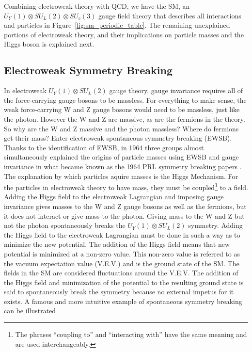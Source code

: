 Combining electroweak theory with QCD, we have the SM, an $U_{Y}(1) \otimes SU_{L}(2) \otimes SU_{c}(3)$ gauge field theory that describes all interactions and particles in
Figure~\ref{fig:sm_periodic_table}. The remaining unexplained portions of electroweak theory, and their implications on particle masses and the Higgs boson is explained next.   

\subsection{Electroweak Symmetry Breaking}

In electroweak $U_{Y}(1) \otimes SU_{L}(2)$ gauge theory, gauge invariance requires all of the force-carrying gauge bosons to be massless.
For everything to make sense, the weak force-carrying W and Z gauge bosons would need to be massless, just like the photon. 
However the W and Z are massive, as are the fermions in the theory.
So why are the W and Z massive and the photon massless? Where do fermions get their mass?
Enter electroweak spontaneous symmetry breaking (EWSB). Thanks to the identification of EWSB, in 1964 
three groups almost simultaneously explained the origins of particle masses using EWSB and gauge invariance in what became known as the 1964 PRL symmetry breaking papers
\cite{1964_prl_englert}\cite{1964_prl_higgs}\cite{1964_prl_guralnik}.
The explanation by which particles aquire masses is the Higgs Mechanism. For the particles in electroweak theory to have mass, they must be coupled\footnote{The phrases
``coupling to'' and ``interacting with'' have the same meaning and are used interchangeably.} to a field.
Adding the Higgs field to the electroweak Lagrangian and imposing gauge invariance gives masses to the W and Z gauge bosons as well as the fermions, but it does not interact
or give mass to the photon. Giving mass to the W and Z but not the photon spontaneously breaks the $U_{Y}(1) \otimes SU_{L}(2)$ symmetry.
Adding the Higgs field to the electroweak Lagrangian must be done in such a way as to minimize the new potential. The addition of the Higgs field means that new potential
is minimized at a non-zero value. This non-zero value is referred to as the vacuum expectation value (V.E.V.) and is the ground state of the SM.
The fields in the SM are considered fluctuations around the V.E.V. The addition of the Higgs field and minimization of the potential to the resulting ground state
is said to spontaneously break the symmetry because no external impetus for it exists. A famous and more intuitive example of spontaneous symmetry breaking can be illustrated
